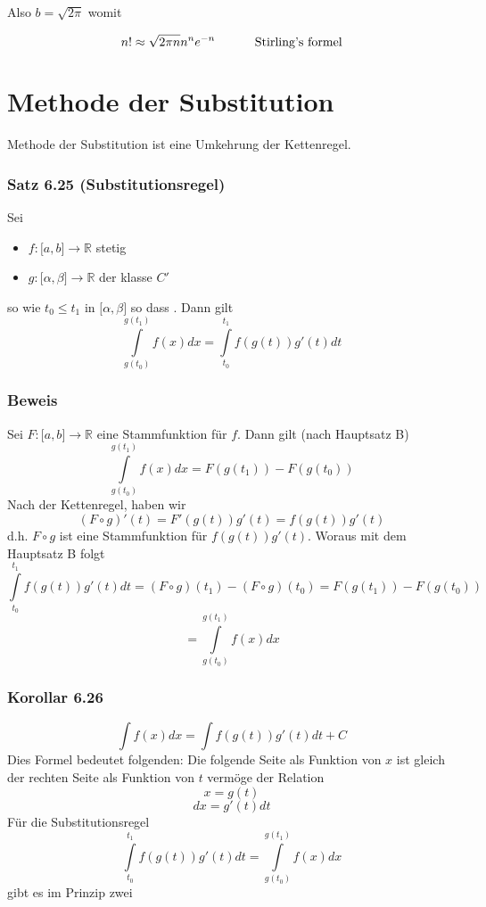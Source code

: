 Also $b=\sqrt{2\pi}$ womit 
\begin{framed}
\[n! \approx \sqrt {2\pi n} {n^n}{e^{ - n}}\text{\hspace{10mm} Stirling's formel}\]
\end{framed}

\section{Methode der Substitution}
Methode der Substitution ist eine Umkehrung der Kettenregel.
\subsubsection*{Satz 6.25 (Substitutionsregel)}
Sei 
\begin{itemize}
\item $f:\lbrack a,b\rbrack\rightarrow\mathbb{R}$ stetig
\item $g:\lbrack\alpha,\beta\rbrack\rightarrow\mathbb{R}$ der klasse $C'$
\end{itemize}
so wie $t_0\leq t_1$ in  $\lbrack\alpha,\beta\rbrack$ so dass .
Dann gilt 
\[\int\limits_{g({t_0})}^{g({t_1})} {f(x)dx = \int\limits_{{t_0}}^{{t_1}} {f\left( {g\left( t \right)} \right)g'\left( t \right)dt} } \]

\subsubsection*{Beweis}
Sei $F:\lbrack a,b\rbrack\rightarrow\mathbb{R}$ eine Stammfunktion für $f$. Dann gilt (nach Hauptsatz B)
\[\int\limits_{g({t_0})}^{g({t_1})} {f(x)dx = F\left( {g({t_1})} \right)}  - F\left( {g({t_0})} \right)\]
Nach der Kettenregel, haben wir
\[(F \circ g)'(t) = F'(g(t))g'(t) = f(g(t))g'(t)\]
d.h. $F\circ g$ ist eine Stammfunktion für $f(g(t))g'(t)$. Woraus mit dem Hauptsatz B folgt 
\[\int\limits_{{t_0}}^{{t_1}} {f\left( {g(t)} \right)} g'(t)dt = \left( {F \circ g} \right)({t_1}) - \left( {F \circ g} \right)({t_0}) = F\left( {g({t_1})} \right) - F\left( {g({t_0})} \right)\]
\[ = \int\limits_{g({t_0})}^{g({t_1})} {f(x)dx} \]

\subsubsection*{Korollar 6.26}
\[\int {f(x)dx = \int {f\left( {g(t)} \right)} g'(t)dt + C} \]
Dies Formel bedeutet folgenden: Die folgende Seite als Funktion von $x$ ist gleich der rechten Seite als Funktion von $t$ vermöge der Relation $$x=g(t)$$$$dx=g'(t)dt$$
Für die Substitutionsregel 
\[\int\limits_{{t_0}}^{{t_1}} {f\left( {g(t)} \right)g'(t)dt = \int\limits_{g({t_0})}^{g({t_1})} {f(x)dx} } \]
gibt es im Prinzip zwei \\

